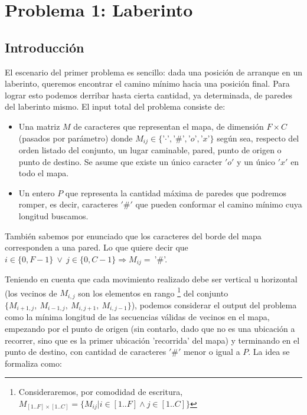 \section{Problema 1: Laberinto}
\subsection{Introducción}

El escenario del primer problema es sencillo: dada una posición de arranque en un laberinto, queremos encontrar el camino mínimo hacia una posición final. Para lograr esto podemos derribar hasta cierta cantidad, ya determinada, de paredes del laberinto mismo. El input total del problema consiste de:

    \begin{itemize}
        \item Una matriz $M$ de caracteres que representan el mapa, de dimensión $F\times C$ (pasados por parámetro) donde $M_{ij} \in \{$'$\cdotp$'$,$'$\#$'$,$'$o$'$,$'$x$'$\}$ según sea, respecto del orden listado del conjunto, un lugar caminable, pared, punto de origen o punto de destino. Se asume que existe un único caracter $'o'$ y un único $'x'$ en todo el mapa.
        \item Un entero $P$ que representa la cantidad máxima de paredes que podremos romper, es decir, caracteres $'\#'$ que pueden conformar el camino mínimo cuya longitud buscamos.
    \end{itemize}

También sabemos por enunciado que los caracteres del borde del mapa corresponden a una pared. Lo que quiere decir que $i \in \{0, F-1\} \ \vee \ j \in \{0, C-1\} \Rightarrow M_{ij} =\ $'$\#$'.

Teniendo en cuenta que cada movimiento realizado debe ser vertical u horizontal (los vecinos de $M_{i,j}$ son los elementos en rango \footnote{Consideraremos, por comodidad de escritura, $M_{[1..F]\times[1..C]} = \Big\{ M_{ij} \Big | i \in [1..F] \land j \in [1..C] \Big\} $} del conjunto $\{M_{i+1,j},\ M_{i-1,j},\ M_{i,j+1},\ M_{i,j-1}\}$), podemos considerar el output del problema como la mínima longitud de las secuencias válidas de vecinos en el mapa, empezando por el punto de origen (sin contarlo, dado que no es una ubicación a recorrer, sino que es la primer ubicación 'recorrida' del mapa) y terminando en el punto de destino, con cantidad de caracteres $'\#'$ menor o igual a $P$. La idea se formaliza como:
\\

